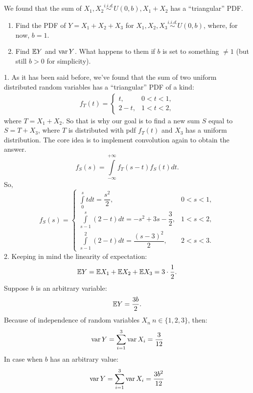 \documentclass[12pt]{report}
\begin{document}
\begin{problem}{}
    We found that the sum of $X_1, X_2 \overset{i.i.d.}{\sim} U(0, b), X_1+X_2$ has a ``triangular'' PDF.
    \begin{enumerate}
        \item Find the PDF of $Y = X_1 + X_2 + X_3$ for $X_1, X_2, X_3 \overset{i.i.d.}{\sim} U(0, b)$, where, for now, $b = 1$.
        \item Find $\mathbb{E} Y$ and $\operatorname{var} Y$. What happens to them if $b$ is set to something $\neq 1$ (but still $b > 0$ for simplicity).
    \end{enumerate}
\end{problem}

\begin{solution}
    1. As it has been said before, we've found that the sum of two uniform distributed random variables has a ``triangular'' PDF of a kind:
    \[
        \begin{array}{c}
            f_T(t) = \left\{
                \begin{array}{cc}
                    t, & 0 < t < 1,\\
                    2-t, & 1 < t < 2,
                \end{array}
             \right.
        \end{array}    
    \]
    where $T = X_1 + X_2$. So that is why our goal is to find a new sum $S$ equal to $S = T + X_3$, where $T$ is distributed with pdf $f_T(t)$ and $X_3$ has a uniform distribution. The core idea is to implement convolution again to obtain the answer.
    \[
        f_S(s) = \int\limits_{-\infty}^{+\infty} f_{T}(s - t)f_S(t) dt.
    \]
    So, 
    \[
        f_S(s) = \left\{
            \begin{array}{cc}
                \displaystyle\int\limits_0^s t dt = \dfrac{s^2}{2}, & 0 < s < 1,\\
                \displaystyle\int\limits_{s-1}^s (2-t)dt = -s^2 + 3s - \dfrac{ 3}{2}, & 1 < s < 2,\\
                \displaystyle \int\limits_{s-1}^2 (2-t)dt = \dfrac{(s - 3)^2}{2}, & 2 < s < 3.
            \end{array}
         \right.  
    \]
    2. Keeping in mind the linearity of expectation:
    \[
        \mathbb{E} Y = \mathbb{E} X_1 + \mathbb{E} X_2 + \mathbb{E} X_3 = 3\cdot \dfrac{1}{2}.
    \]
    Suppose $b$ is an arbitrary variable:
    \[
        \mathbb{E} Y = \dfrac{3b}{2}.
    \]
    Because of independence of random variables $X_n\ n\in \{1,2,3\}$, then:
    \[
        \operatorname{var} Y = \sum\limits_{i=1}^3\operatorname{var} X_i = \dfrac{3}{12}
    \]
    In case when $b$ has an arbitrary value:
    \[
        \operatorname{var} Y = \sum\limits_{i=1}^3\operatorname{var} X_i = \dfrac{3b^2}{12}
    \]
\end{solution}
\end{document}
